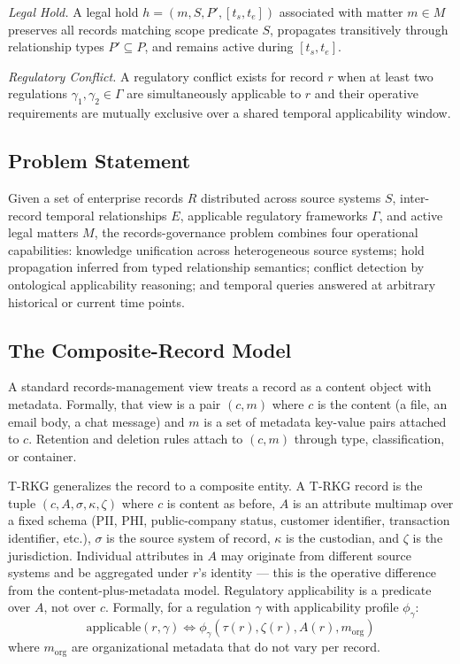 \documentclass{ieeeaccess}
\begin{document}
\textit{Legal Hold.} A legal hold $h = (m, S, P', [t_s, t_e])$ associated with matter $m \in M$ preserves all records matching scope predicate $S$, propagates transitively through relationship types $P' \subseteq P$, and remains active during $[t_s, t_e]$.

\textit{Regulatory Conflict.} A regulatory conflict exists for record $r$ when at least two regulations $\gamma_1, \gamma_2 \in \Gamma$ are simultaneously applicable to $r$ and their operative requirements are mutually exclusive over a shared temporal applicability window.

\subsection{Problem Statement}

Given a set of enterprise records $R$ distributed across source systems $S$, inter-record temporal relationships $E$, applicable regulatory frameworks $\Gamma$, and active legal matters $M$, the records-governance problem combines four operational capabilities: knowledge unification across heterogeneous source systems; hold propagation inferred from typed relationship semantics; conflict detection by ontological applicability reasoning; and temporal queries answered at arbitrary historical or current time points.

\subsection{The Composite-Record Model}
\label{sec:composite}

A standard records-management view treats a record as a content object with metadata. Formally, that view is a pair $(c, m)$ where $c$ is the content (a file, an email body, a chat message) and $m$ is a set of metadata key-value pairs attached to $c$. Retention and deletion rules attach to $(c, m)$ through type, classification, or container.

T-RKG generalizes the record to a composite entity. A T-RKG record is the tuple $(c, A, \sigma, \kappa, \zeta)$ where $c$ is content as before, $A$ is an attribute multimap over a fixed schema (PII, PHI, public-company status, customer identifier, transaction identifier, etc.), $\sigma$ is the source system of record, $\kappa$ is the custodian, and $\zeta$ is the jurisdiction. Individual attributes in $A$ may originate from different source systems and be aggregated under $r$'s identity --- this is the operative difference from the content-plus-metadata model. Regulatory applicability is a predicate over $A$, not over $c$. Formally, for a regulation $\gamma$ with applicability profile $\phi_\gamma$:
\begin{equation}
    \mathrm{applicable}(r, \gamma) \iff \phi_\gamma(\tau(r), \zeta(r), A(r), m_{\mathrm{org}})
\end{equation}
where $m_{\mathrm{org}}$ are organizational metadata that do not vary per record.
\end{document}
